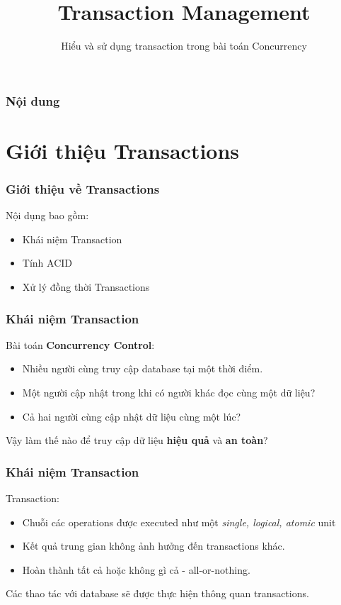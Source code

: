 \documentclass[xcolor={table, dvipsnames}]{beamer}
\title{Transaction Management}
\subtitle{Hiểu và sử dụng transaction trong bài toán Concurrency}
\begin{document}
\frame{\titlepage}

\begin{frame}
\frametitle{Nội dung}
\tableofcontents
\end{frame}

\section{Giới thiệu Transactions}

\begin{frame}
\frametitle{Giới thiệu về Transactions}

Nội dụng bao gồm:
\begin{itemize}
\item Khái niệm Transaction
\item Tính ACID
\item Xử lý đồng thời Transactions
\end{itemize}

\end{frame}

\begin{frame}
\frametitle{Khái niệm Transaction}

Bài toán \textbf{Concurrency Control}:
\begin{itemize}
\item Nhiều người cùng truy cập database tại một thời điểm.
\item Một người cập nhật trong khi có người khác đọc cùng một dữ liệu?
\item Cả hai người cùng cập nhật dữ liệu cùng một lúc?
\end{itemize}
Vậy làm thế nào để truy cập dữ liệu \textbf{hiệu quả} và \textbf{an toàn}?

\end{frame}

\begin{frame}
\frametitle{Khái niệm Transaction}

Transaction:
\begin{itemize}
\item Chuỗi các operations được executed như một \textit{single, logical, atomic} unit
\item Kết quả trung gian không ảnh hưởng đến transactions khác.
\item Hoàn thành tất cả hoặc không gì cả - all-or-nothing.
\end{itemize}
Các thao tác với database sẽ được thực hiện thông quan transactions.
\end{frame}
\end{document}
